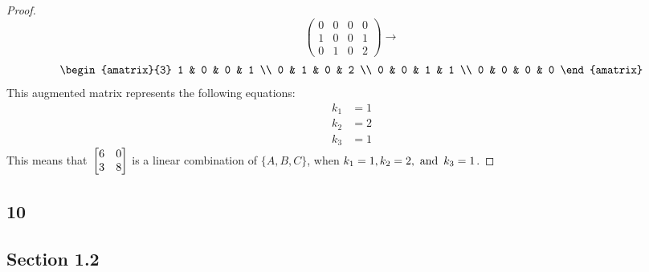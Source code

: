\begin{enumerate}
\begin{proof}
\[\begin{pmatrix}
        0 & 0 & 0 & 0 \\
        1 & 0 & 0 & 1 \\
        0 & 1 & 0 & 2
      \end{pmatrix} \rightarrow
    \]
    \[
      \begin{amatrix}{3}
        1 & 0 & 0 & 1 \\
        0 & 1 & 0 & 2 \\
        0 & 0 & 1 & 1 \\
        0 & 0 & 0 & 0
      \end{amatrix}
    \]
    This augmented matrix represents the following equations:
    \begin{align*}
      k_1 & = 1 \\
      k_2 & = 2 \\
      k_3 & = 1
    \end{align*}
    This means that $\operatorname{\displaystyle} \begin{bmatrix} 6 & 0 \\ 3 & 8 \end{bmatrix}$ is a linear combination of $\{A,B,C\}$, when $k_1 = 1, k_2 = 2, \operatorname{~\text{and}~} k_3 = 1$.
  \end{proof}

\end{enumerate}

\subsection*{10}
\begin{enumerate}
\end{enumerate}

\subsection*{Section 1.2}
